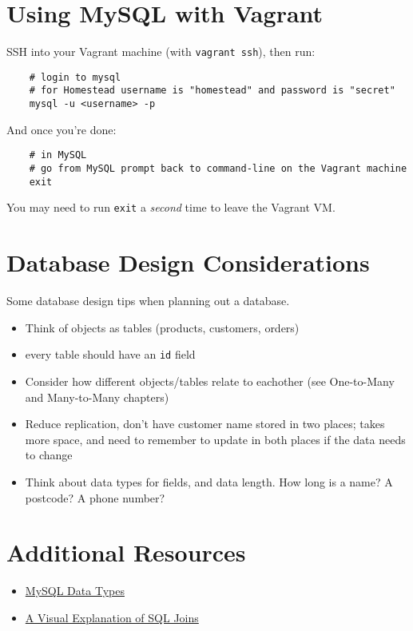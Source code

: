 \section{Using MySQL with Vagrant}

SSH into your Vagrant machine (with \texttt{vagrant ssh}), then run:

\begin{verbatim}
    # login to mysql
    # for Homestead username is "homestead" and password is "secret"
    mysql -u <username> -p
\end{verbatim}

And once you're done:

\begin{verbatim}
    # in MySQL
    # go from MySQL prompt back to command-line on the Vagrant machine
    exit
\end{verbatim}

You may need to run \texttt{exit} a \textit{second} time to leave the Vagrant VM.

\section{Database Design Considerations}

Some database design tips when planning out a database.

\begin{itemize}[leftmargin=*]
    \item {Think of objects as tables (products, customers, orders)}
    \item {every table should have an \texttt{id} field}
    \item {Consider how different objects/tables relate to eachother (see One-to-Many and Many-to-Many chapters)}
    \item {Reduce replication, don't have customer name stored in two places; takes more space, and need to remember to update in both places if the data needs to change}
    \item {Think about data types for fields, and data length. How long is a name? A postcode? A phone number?}
\end{itemize}

\section{Additional Resources}

\begin{itemize}[leftmargin=*]
    \item \href{https://dev.mysql.com/doc/refman/5.7/en/data-types.html}{MySQL Data Types}
    \item \href{https://blog.codinghorror.com/a-visual-explanation-of-sql-joins/}{A Visual Explanation of SQL Joins}
\end{itemize}
